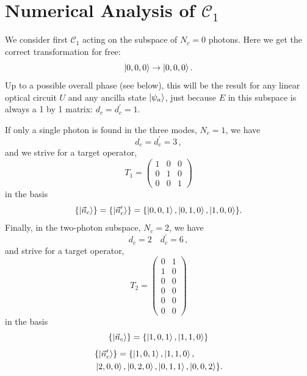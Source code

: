 \documentclass[aps,pra,twocolumn,superscriptaddress,floatfix,10pt]{revtex4}
\begin{document}
\section{Numerical Analysis of $\mathcal{C}_1$}
\label{Section Numerical Testing}
We consider first $\mathcal{C}_1$ acting on the subspace of $N_c=0$ photons. Here we get the correct transformation for free:
\begin{equation}
\label{Free Operation}
\ket{0,0,0} \rightarrow \ket{0,0,0}.
\end{equation}
Up to a possible overall phase (see below), this will be the result for any linear optical circuit  $U$ and any ancilla state $\ket{\psi_a}$, just because $E$ in this subspace is always a 1 by 1 matrix: $d_c = d_c^\prime = 1$.


If only a single photon is found in the three modes, $N_c=1$, we have
\begin{equation}
d_c = d_c^\prime = 3\,,
\end{equation}
and we strive for a target operator,
\begin{equation}
\label{T1 1C2T}
T_1=	\begin{pmatrix} 1 & 0 & 0  \\ 0 & 1 & 0  \\ 0 & 0 & 1   \end{pmatrix}  
\end{equation}
in the basis
\begin{equation}
\{ \ket{\vec{n}_c} \} = \{ \ket{\vec{n}_c^\prime} \} = \{ \ket{0,0,1},\ket{0,1,0},\ket{1,0,0} \}.
\end{equation}
Finally, in the two-photon subspace, $N_c=2$, we have
\begin{equation}
d_c = 2 \quad d_c^\prime = 6 \,,
\end{equation}
and strive for a target operator,
\begin{equation}
\label{T2 1C2T}
T_2=\begin{pmatrix} 0 & 1  \\ 1 & 0  \\ 0 & 0 \\ 0 & 0 \\ 0 & 0 \\ 0 & 0   \end{pmatrix}  
\end{equation}
in the basis
\begin{equation}
\{ \ket{\vec{n}_c} \} = \{ \ket{1,0,1},\ket{1,1,0} \}
\end{equation}
\begin{eqnarray}
& \{ \ket{\vec{n}^\prime_c } \} = \{ \ket{1,0,1},\ket{1,1,0}, \\ &\ket{2,0,0},\ket{0,2,0},\ket{0,1,1},\ket{0,0,2} \}. \nonumber
\end{eqnarray}
\end{document}
